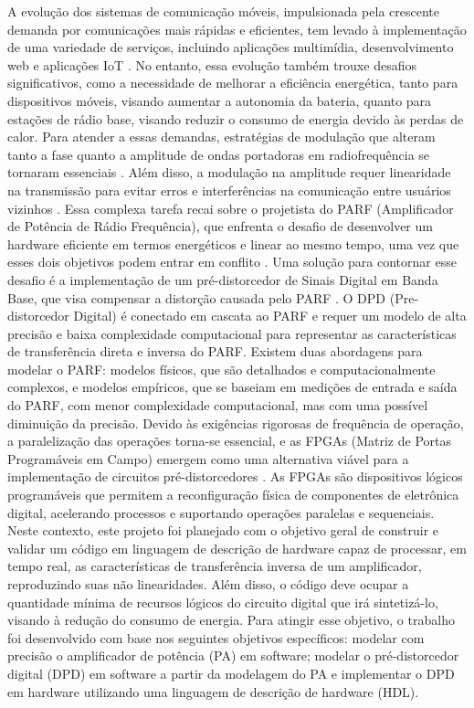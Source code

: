 A evolução dos sistemas de comunicação móveis, impulsionada pela crescente demanda por comunicações mais rápidas e eficientes, tem levado à implementação de uma variedade de serviços, incluindo aplicações multimídia, desenvolvimento web e aplicações IoT \cite{John2016}. No entanto, essa evolução também trouxe desafios significativos, como a necessidade de melhorar a eficiência energética, tanto para dispositivos móveis, visando aumentar a autonomia da bateria, quanto para estações de rádio base, visando reduzir o consumo de energia devido às perdas de calor. Para atender a essas demandas, estratégias de modulação que alteram tanto a fase quanto a amplitude de ondas portadoras em radiofrequência se tornaram essenciais \cite{Kenington2000}. Além disso, a modulação na amplitude requer linearidade na transmissão para evitar erros e interferências na comunicação entre usuários vizinhos \cite{Cripps2006}. Essa complexa tarefa recai sobre o projetista do PARF (Amplificador de Potência de Rádio Frequência), que enfrenta o desafio de desenvolver um hardware eficiente em termos energéticos e linear ao mesmo tempo, uma vez que esses dois objetivos podem entrar em conflito \cite{Chavez2018}. Uma solução para contornar esse desafio é a implementação de um pré-distorcedor de Sinais Digital em Banda Base, que visa compensar a distorção causada pelo PARF \cite{Cripps2006}. O DPD (Pre-distorcedor Digital) é conectado em cascata ao PARF e requer um modelo de alta precisão e baixa complexidade computacional para representar as características de transferência direta e inversa do PARF. Existem duas abordagens para modelar o PARF: modelos físicos, que são detalhados e computacionalmente complexos, e modelos empíricos, que se baseiam em medições de entrada e saída do PARF, com menor complexidade computacional, mas com uma possível diminuição da precisão. Devido às exigências rigorosas de frequência de operação, a paralelização das operações torna-se essencial, e as FPGAs (Matriz de Portas Programáveis em Campo) emergem como uma alternativa viável para a implementação de circuitos pré-distorcedores \cite{Pedroni2010}. As FPGAs são dispositivos lógicos programáveis que permitem a reconfiguração física de componentes de eletrônica digital, acelerando processos e suportando operações paralelas e sequenciais. 
Neste contexto, este projeto foi planejado com o objetivo geral de construir e validar um código em linguagem de descrição de hardware capaz de processar, em tempo real, as características de transferência inversa de um amplificador, reproduzindo suas não linearidades. Além disso, o código deve ocupar a quantidade mínima de recursos lógicos do circuito digital que irá sintetizá-lo, visando à redução do consumo de energia. Para atingir esse objetivo, o trabalho foi desenvolvido com base nos seguintes objetivos específicos: modelar com precisão o amplificador de potência (PA) em software; modelar o pré-distorcedor digital (DPD) em software a partir da modelagem do PA e implementar o DPD em hardware utilizando uma linguagem de descrição de hardware (HDL).

